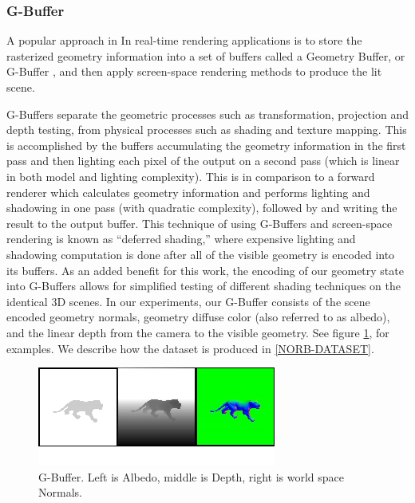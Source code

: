 \documentclass[10pt,twocolumn,letterpaper]{article}
\begin{document}
\subsubsection{G-Buffer}

A popular approach in In real-time rendering applications is to store the rasterized geometry information into a set of buffers called a Geometry Buffer, or G-Buffer \cite{Saito:1990:CRS:97879.97901}, and then apply screen-space rendering methods to produce the lit scene.

G-Buffers separate the geometric processes such as transformation, projection and depth testing, from physical processes such as shading and texture mapping. This is accomplished by the buffers accumulating the geometry information in the first pass and then lighting each pixel of the output on a second pass (which is linear in both model and lighting complexity).  This is in comparison to a forward renderer which calculates geometry information and performs lighting and shadowing in one pass (with quadratic complexity), followed by and writing the result to the output buffer. This technique of using G-Buffers and screen-space rendering is known as ``deferred shading,'' where expensive lighting and shadowing computation is done after all of the visible geometry is encoded into its buffers.
 As an added benefit for this work, the encoding of our geometry state into G-Buffers allows for simplified testing of different shading techniques on the identical 3D scenes.
In our experiments, our G-Buffer consists of the scene encoded geometry normals, geometry diffuse color (also referred to as albedo), and the linear depth from the camera to the visible geometry.  See figure \ref{fig:GBUFFER_ALBEDO}, for examples. We describe how the dataset is produced in \ref{NORB-DATASET}.

\begin{figure}[h!]
\centering
\includegraphics[width=0.8\columnwidth]{./assets/gbuffer-onerow.png}
\caption{G-Buffer. Left is Albedo, middle is Depth, right is world space Normals.}
\label{fig:GBUFFER_ALBEDO} 
\end{figure}
\end{document}
